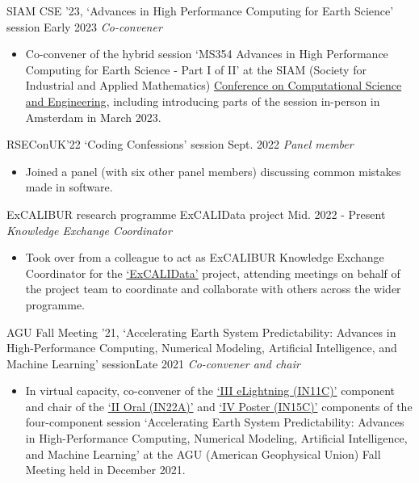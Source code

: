 \begin{projects}
\projecta
	{SIAM CSE '23, `Advances in High Performance Computing for Earth Science' session \lbrack\href{https://meetings.siam.org/sess/dsp_programsess.cfm?SESSIONCODE=75467}{\small{\websiteSymbol}}\rbrack}{Early 2023}
	{
	    \textit{Co-convener}
	}
	{\begin{itemize}
     \item Co-convener of the hybrid session `MS354 Advances in High Performance Computing for Earth Science - Part I of II' at the SIAM (Society for Industrial and Applied Mathematics) \href{https://www.siam.org/conferences-events/past-event-archive/cse23/}{Conference on Computational Science and Engineering}, including introducing parts of the session in-person in Amsterdam in March 2023.
     \end{itemize}
     }

\projecta
	{RSEConUK'22 `Coding Confessions' session \lbrack\href{https://www.youtube.com/watch?v=0BGYOYj7OjQ}{\small{\videoSymbol}}\rbrack}{Sept. 2022}
	{
	    \textit{Panel member}
	}
	{
    \begin{itemize}
        \item Joined a panel (with six other panel members) discussing common mistakes made in software.
    \end{itemize}}

\projecta
	{ExCALIBUR research programme ExCALIData project \lbrack\href{https://excalibur.ac.uk/}{\small{\websiteSymbol}}\rbrack}{Mid. 2022 - Present}
	{
	    \textit{Knowledge Exchange Coordinator}
	}
	{\begin{itemize}
     \item Took over from a colleague to act as ExCALIBUR Knowledge Exchange Coordinator for the \href{https://excalibur.ac.uk/projects/excalidata/}{`ExCALIData'} project, attending meetings on behalf of the project team to coordinate and collaborate with others across the wider programme.
     \end{itemize}}

\projecta
	{AGU Fall Meeting '21, `Accelerating Earth System Predictability: Advances in High-Performance Computing, Numerical Modeling, Artificial Intelligence, and Machine Learning' session}{Late 2021}
	{
	    \textit{Co-convener and chair}
	}
	{\begin{itemize}
     \item In virtual capacity, co-convener of the \href{https://agu.confex.com/agu/fm21/meetingapp.cgi/Session/152558}{`III eLightning (IN11C)'} component and chair of the \href{https://agu.confex.com/agu/fm21/meetingapp.cgi/Session/132759}{`II Oral (IN22A)'} and \href{https://agu.confex.com/agu/fm21/meetingapp.cgi/Session/129326}{`IV Poster (IN15C)'} components of the four-component session `Accelerating Earth System Predictability: Advances in High-Performance Computing, Numerical Modeling, Artificial Intelligence, and Machine Learning' at the AGU (American Geophysical Union) Fall Meeting held in December 2021.
     \end{itemize}}


\end{projects}
